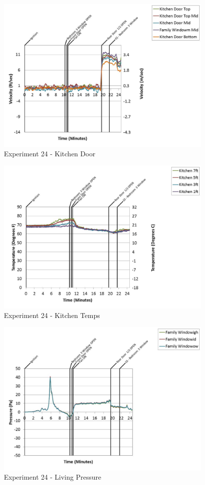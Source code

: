 \documentclass{article}
\begin{document}
\begin{appendices}
	\begin{figure}[h!]
		\centering
		\includegraphics[height=3.05in]{0_Images/Results_Charts/Exp_24_Charts/KitchenDoor.pdf}
		\caption{Experiment 24 - Kitchen Door}
	\end{figure}
 
	\clearpage

	\begin{figure}[h!]
		\centering
		\includegraphics[height=3.05in]{0_Images/Results_Charts/Exp_24_Charts/KitchenTemps.pdf}
		\caption{Experiment 24 - Kitchen Temps}
	\end{figure}
 

	\begin{figure}[h!]
		\centering
		\includegraphics[height=3.05in]{0_Images/Results_Charts/Exp_24_Charts/LivingPressure.pdf}
		\caption{Experiment 24 - Living Pressure}
	\end{figure}
 

\end{appendices}
\end{document}
